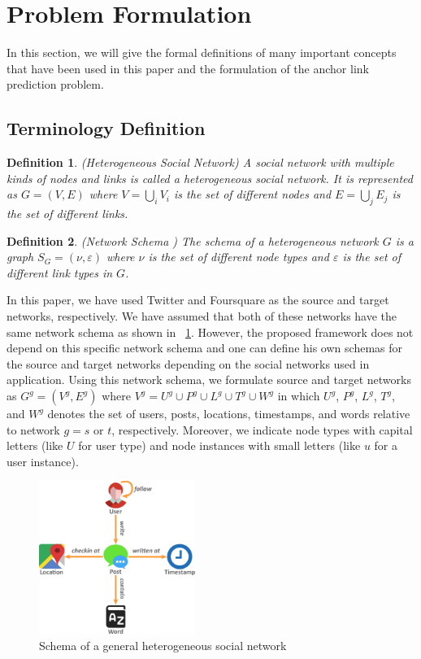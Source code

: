 \documentclass[conference]{IEEEtran}
\newtheorem{definition}{Definition}[section]
\begin{document}
\section{Problem Formulation}\label{sec:problem}
In this section, we will give the formal definitions of many important concepts that have been used in this paper and the formulation of
the anchor link prediction problem.
\subsection{Terminology Definition}
\begin{definition}{(Heterogeneous Social Network)}
A social network with multiple kinds of nodes and links is called a heterogeneous social network. It is represented as $G=(V,E)$ where $V=\bigcup_iV_i$ is the set of different nodes and $E=\bigcup_jE_j$ is the set of different links.
\end{definition}

\begin{definition}{(Network Schema \cite{sun2012mining})}
The schema of a heterogeneous network $G$ is a graph $S_G=(\nu, \varepsilon)$ where $\nu$ is the set of different node types and $\varepsilon$ is the set of different link types in $G$.
\end{definition}

In this paper, we have used Twitter and Foursquare as the source and target networks, respectively. We have assumed that both of these networks have the same network schema as shown in \figurename~\ref{fig:schema}. However, the proposed framework does not depend on this specific network schema and one can define his own schemas for the source and target networks depending on the social networks used in application. Using this network schema, we formulate source and target networks as $G^g=(V^g,E^g)$ where $V^g=U^g\cup P^g\cup L^g\cup T^g\cup W^g$ in which $U^g$, $P^g$, $L^g$, $T^g$, and $W^g$ denotes the set of users, posts, locations, timestamps, and words relative to network $g=s$ or $t$, respectively. Moreover, we indicate node types with capital letters (like $U$ for user type) and node instances with small letters (like $u$ for a user instance).

\begin{figure}[!t]
\centering
\includegraphics[width=2in]{schema.pdf}
\caption{Schema of a general heterogeneous social network}
\label{fig:schema}
\end{figure} 
\end{document}

